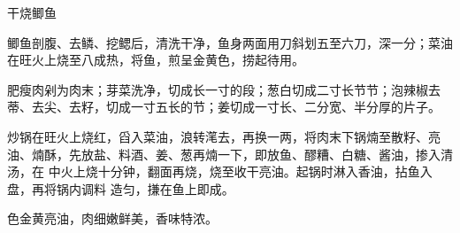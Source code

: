 %
%
%
%
%
%
%
\begin{recipe}{干烧鲫鱼}

\ingredients


\preparation

\step 鲫鱼剖腹、去鳞、挖鳃后，清洗干净，鱼身两面用刀斜划五至六刀，深一分；菜油
在旺火上烧至八成热，将鱼，煎呈金黄色，捞起待用。

\step 肥瘦肉剁为肉末；芽菜洗净，切成长一寸的段；葱白切成二寸长节节；泡辣椒去
蒂、去尖、去籽，切成一寸五长的节；姜切成一寸长、二分宽、半分厚的片子。

\step 炒锅在旺火上烧红，舀入菜油，浪转滗去，再换一两，将肉末下锅煵至散籽、亮
油、煵酥，先放盐、料酒、姜、葱再煵一下，即放鱼、醪糟、白糖、酱油，掺入清汤，在
中火上烧十分钟，翻面再烧，烧至收干亮油。起锅时淋入香油，拈鱼入盘，再将锅内调料
造匀，搛在鱼上即成。

\features

色金黄亮油，肉细嫩鲜美，香味特浓。

\end{recipe}

